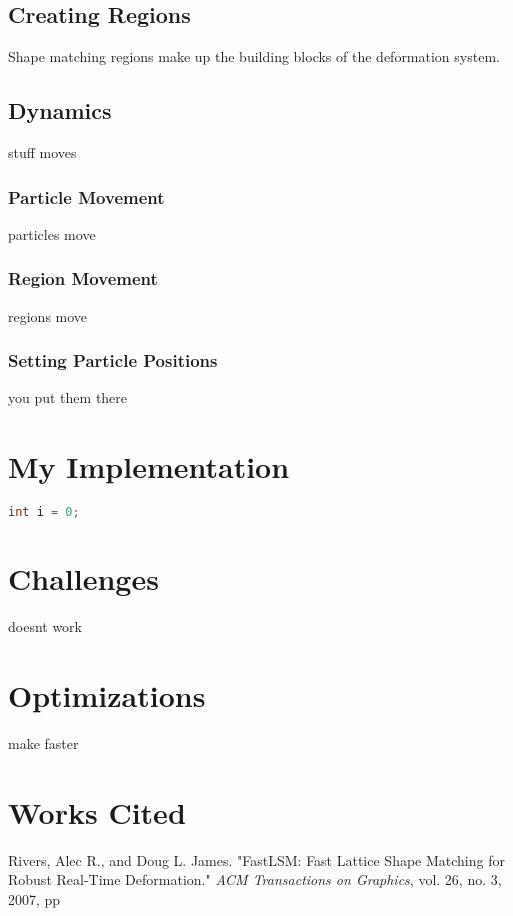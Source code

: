 \documentclass[12pt,a4paper]{article}
\begin{document}
	\subsection{Creating Regions}
	Shape matching regions make up the building blocks of the deformation system.
	
	\subsection{Dynamics}
	stuff moves
	
	\subsubsection{Particle Movement}
	particles move
	
	\subsubsection{Region Movement}
	regions move
	
	\subsubsection{Setting Particle Positions}
	you put them there
	
	\section{My Implementation}
	\begin{lstlisting}[language=C++]
	int i = 0;
	\end{lstlisting}
	
	\section{Challenges}
	doesnt work
	
	\section{Optimizations}
	make faster
	
	\section{Works Cited}
	Rivers, Alec R., and Doug L. James. "FastLSM: Fast Lattice Shape Matching for Robust Real-Time Deformation." \textit{ACM Transactions on Graphics}, vol. 26, no. 3, 2007, pp
	
	
\end{document}
